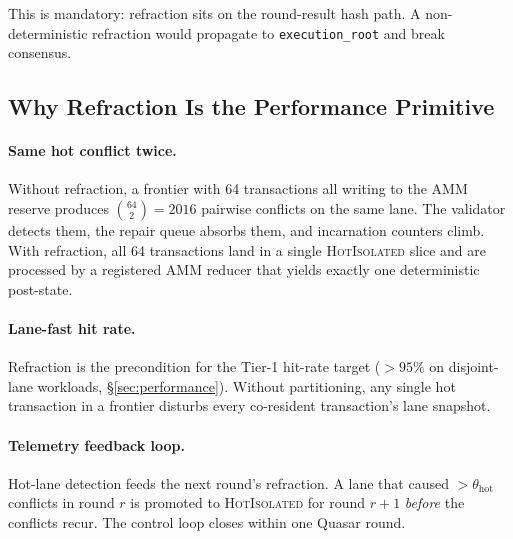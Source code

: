 This is mandatory: refraction sits on the round-result hash path.
A non-deterministic refraction would propagate to
\texttt{execution\_root} and break consensus.

\subsection{Why Refraction Is the Performance Primitive}

\paragraph{Same hot conflict twice.}
Without refraction, a frontier with 64 transactions all writing to
the AMM reserve produces $\binom{64}{2} = 2016$ pairwise conflicts on
the same lane. The validator detects them, the repair queue
absorbs them, and incarnation counters climb. With refraction, all
64 transactions land in a single \textsc{HotIsolated} slice and are
processed by a registered AMM reducer that yields exactly one
deterministic post-state.

\paragraph{Lane-fast hit rate.}
Refraction is the precondition for the Tier-1 hit-rate target
($> 95\%$ on disjoint-lane workloads, \S\ref{sec:performance}).
Without partitioning, any single hot transaction in a frontier
disturbs every co-resident transaction's lane snapshot.

\paragraph{Telemetry feedback loop.}
Hot-lane detection feeds the next round's refraction. A lane that
caused $> \theta_{\mathrm{hot}}$ conflicts in round $r$ is promoted
to \textsc{HotIsolated} for round $r+1$ \emph{before} the conflicts
recur. The control loop closes within one Quasar round.


